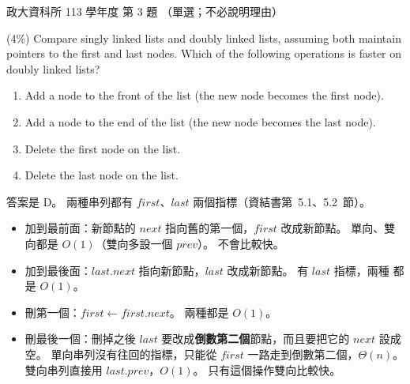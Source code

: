 \begin{pastexam}[label={px:nccu-113-dsa-03}]{政大資科所 113 學年度 第 3 題}
（單選；不必說明理由）

(4\%) Compare singly linked lists and doubly linked lists, assuming both maintain pointers to the first and
last nodes. Which of the following operations is faster on doubly linked lists?
\begin{enumerate}[label=\Alph*.]
\item Add a node to the front of the list (the new node becomes the first node).
\item Add a node to the end of the list (the new node becomes the last node).
\item Delete the first node on the list.
\item Delete the last node on the list.
\end{enumerate}
\end{pastexam}

\begin{pastsoln}
答案是 D。 兩種串列都有 $\mathit{first}$、$\mathit{last}$ 兩個指標（資結書第~5.1、5.2~節）。

\begin{itemize}
\item[A.] 加到最前面：新節點的 $\mathit{next}$ 指向舊的第一個，$\mathit{first}$ 改成新節點。 單向、雙向都是
$O(1)$（雙向多設一個 $\mathit{prev}$）。 不會比較快。
\item[B.] 加到最後面：$\mathit{last.next}$ 指向新節點，$\mathit{last}$ 改成新節點。 有 $\mathit{last}$ 指標，兩種
都是 $O(1)$。
\item[C.] 刪第一個：$\mathit{first} \gets \mathit{first.next}$。 兩種都是 $O(1)$。
\item[D.] 刪最後一個：刪掉之後 $\mathit{last}$ 要改成\textbf{倒數第二個}節點，而且要把它的 $\mathit{next}$ 設成
空。 單向串列沒有往回的指標，只能從 $\mathit{first}$ 一路走到倒數第二個，$\Theta(n)$。 雙向串列直接用
$\mathit{last.prev}$，$O(1)$。 只有這個操作雙向比較快。
\end{itemize}
\end{pastsoln}
